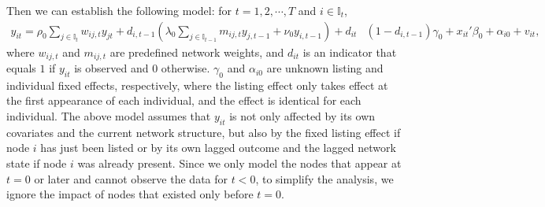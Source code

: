 \documentclass[11pt,a4paper]{article}
\begin{document}
Then we can establish the following model: for $t=1,2,\cdots,T$ and $i\in\mathbb{I}_t$,
\begin{align}\label{model_e}
y_{it}=\rho_0\sum_{j\in\mathbb{I}_t}w_{ij,t}y_{jt}+d_{i,t-1}(\lambda_0\sum_{j\in\mathbb{I}_{t-1}}m_{ij,t}y_{j,t-1}+\nu_0 y_{i,t-1})+d_{it}&(1-d_{i,t-1})\gamma_0+x_{it}'\beta_0+\alpha_{i0}+v_{it},
\end{align}
%
where $w_{ij,t}$ and $m_{ij,t}$ are predefined network weights,
and $d_{it}$ is an indicator that equals $1$ if $y_{it}$ is observed and 0 otherwise. $\gamma_0$ and $\alpha_{i0}$ are unknown listing and individual fixed effects, respectively, where the listing effect only takes effect at the first appearance of each individual, and the effect is identical for each individual. %
The above model assumes that $y_{it}$ is not only affected by its own covariates and the current network structure, but also by the fixed listing effect if node $i$ has just been listed or by its own lagged outcome and the lagged network state if node $i$ was already present. Since we only model the nodes that appear at $t = 0$ or later and cannot observe the data for $t<0$, to simplify the analysis, we ignore the impact of nodes that existed only before $t=0$.
\end{document}
